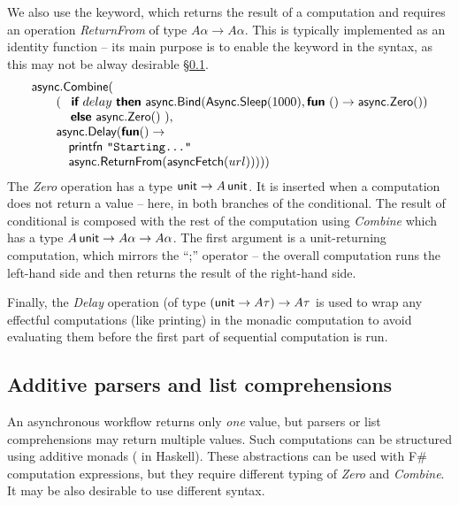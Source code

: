 \documentclass[runningheads,a4paper]{llncs}
\begin{document}
We also use the  keyword, which returns the result of a computation and requires
an operation \emph{ReturnFrom} of type $A\alpha \rightarrow A\alpha$. This is typically
implemented as an identity function -- its main purpose is to enable the  keyword in 
the syntax, as this may not be alway desirable \S\ref{sec:intro-seq-parsers}.
%
\begin{equation*}
\begin{array}{l}
\textnormal{\sffamily async}.\textnormal{\sffamily Combine}( \\
\quad\quad (~~\,\textnormal{\bfseries\sffamily if}~delay~\textnormal{\bfseries\sffamily then}~
   \textnormal{\sffamily async}.\textnormal{\sffamily Bind}(\textnormal{\sffamily Async}.\textnormal{\sffamily Sleep}(1000), \textnormal{\bfseries\sffamily fun}~() \rightarrow \textnormal{\sffamily async}.\textnormal{\sffamily Zero}())\\
\quad\quad ~~~\,\textnormal{\bfseries\sffamily else}~\textnormal{\sffamily async}.\textnormal{\sffamily Zero}()~),\\
\quad\quad \textnormal{\sffamily async}.\textnormal{\sffamily Delay}(\textnormal{\bfseries\sffamily fun} () \rightarrow\\
\quad\quad\quad \textnormal{\sffamily printfn}~\texttt{"Starting..."}\\
\quad\quad\quad \textnormal{\sffamily async}.\textnormal{\sffamily ReturnFrom}(\textnormal{\sffamily asyncFetch}(url))) ))
\end{array}
\end{equation*}
%
The \emph{Zero} operation has a type $\textnormal{\sffamily unit} \rightarrow A\,\textnormal{\sffamily unit}$. It is inserted
when a computation does not return a value -- here, in both branches of the conditional. The
result of conditional is composed with the rest of the computation using \emph{Combine} which has
a type $A\,\textnormal{\sffamily unit} \rightarrow A\alpha \rightarrow A\alpha$. The first argument is a unit-returning
computation, which mirrors the ``;'' operator -- the overall computation runs the left-hand side and
then returns the result of the right-hand side.

Finally, the \emph{Delay} operation (of type $(\textnormal{\sffamily unit} \rightarrow A\tau) \rightarrow A\tau$ is
used to wrap any effectful computations (like printing) in the monadic computation to avoid evaluating
them before the first part of sequential computation is run.


\subsection{Additive parsers and list comprehensions}
\label{sec:intro-seq-parsers}

An asynchronous workflow returns only \emph{one} value, but parsers or list comprehensions may return 
multiple values. Such computations can be structured using additive monads ( in 
Haskell). These abstractions can be used with F\# computation expressions, but they require different
typing of \emph{Zero} and \emph{Combine}. It may be also desirable to use different syntax.
\end{document}
